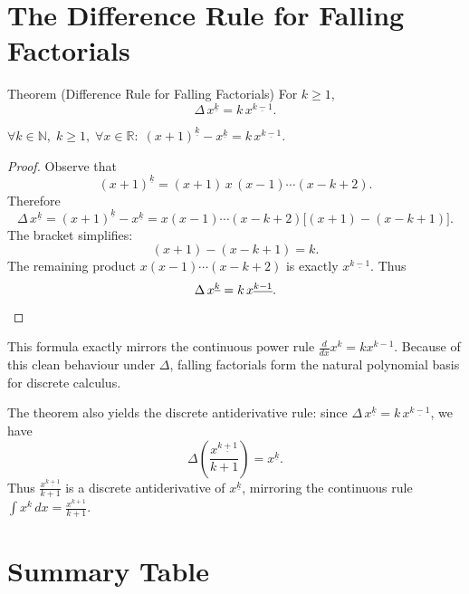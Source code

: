 \section*{The Difference Rule for Falling Factorials}

\begin{theorembox}{Theorem (Difference Rule for Falling Factorials)}
For \(k \ge 1\),
\[
\Delta\, x^{\underline{k}} = k\,x^{\underline{k-1}}.
\]
\end{theorembox}
\label{thm:falling-factorial-rule}

\begin{remark*}
\(\forall k \in \mathbb{N},\; k \ge 1,\; \forall x \in \mathbb{R}:\;
(x+1)^{\underline{k}} - x^{\underline{k}} = k\,x^{\underline{k-1}}\).
\end{remark*}

\begin{proof}
Observe that
\[
(x+1)^{\underline{k}} = (x+1)\,x\,(x-1)\cdots(x-k+2).
\]
Therefore
\[
\Delta\, x^{\underline{k}}
= (x+1)^{\underline{k}} - x^{\underline{k}}
= x(x-1)\cdots(x-k+2)\bigl[(x+1)-(x-k+1)\bigr].
\]
The bracket simplifies:
\[
(x+1)-(x-k+1) = k.
\]
The remaining product \(x(x-1)\cdots(x-k+2)\) is exactly
\(x^{\underline{k-1}}\). Thus
\[
\Delta\, x^{\underline{k}} = k\,x^{\underline{k-1}}. \qedhere
\]
\end{proof}

\begin{remark*}
This formula exactly mirrors the continuous power rule
\(\tfrac{d}{dx}x^k = kx^{k-1}\). Because of this clean behaviour under
\(\Delta\), falling factorials form the natural polynomial basis for
discrete calculus.
\end{remark*}

\begin{remark*}
The theorem also yields the discrete antiderivative rule: since
\(\Delta\,x^{\underline{k}} = k\,x^{\underline{k-1}}\), we have
\[
\Delta\!\left(\frac{x^{\underline{k+1}}}{k+1}\right) = x^{\underline{k}}.
\]
Thus \(\tfrac{x^{\underline{k+1}}}{k+1}\) is a discrete antiderivative
of \(x^{\underline{k}}\), mirroring the continuous rule
\(\int x^k\,dx = \tfrac{x^{k+1}}{k+1}\).
\end{remark*}

\section*{Summary Table}

